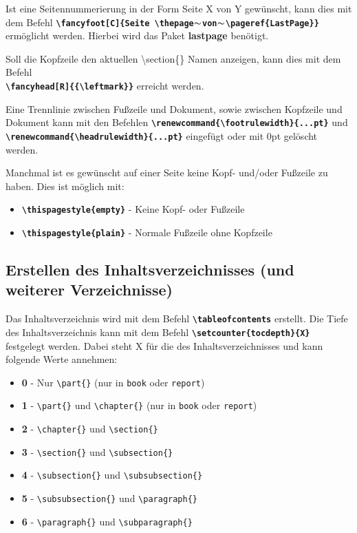Ist eine Seitennummerierung in der Form Seite X von Y gewünscht, kann dies mit dem Befehl \textbf{\texttt{\textbackslash fancyfoot[C]\{Seite \textbackslash thepage$\thicksim$von$\thicksim$\textbackslash pageref\{LastPage\}\}}} ermöglicht werden. Hierbei wird das Paket \textbf{lastpage} benötigt.

Soll die Kopfzeile den aktuellen \textbackslash section\{\} Namen anzeigen, kann dies mit dem Befehl \\ \textbf{\texttt{\textbackslash fancyhead[R]\{\{\textbackslash leftmark\}\}}} erreicht werden.

Eine Trennlinie zwischen Fußzeile und Dokument, sowie zwischen Kopfzeile und Dokument kann mit den Befehlen \textbf{\texttt{\textbackslash renewcommand\{\textbackslash footrulewidth\}\{...pt\}}} und \textbf{\texttt{\textbackslash renewcommand\{\textbackslash headrulewidth\}\{...pt\}}} eingefügt oder mit 0pt gelöscht werden.

Manchmal ist es gewünscht auf einer Seite keine Kopf- und/oder Fußzeile zu haben. Dies ist möglich mit:
\begin{itemize}
    \item \textbf{\texttt{\textbackslash thispagestyle\{empty\}}} - Keine Kopf- oder Fußzeile
    \item \textbf{\texttt{\textbackslash thispagestyle\{plain\}}} - Normale Fußzeile ohne Kopfzeile
\end{itemize}

\subsection{Erstellen des Inhaltsverzeichnisses (und weiterer Verzeichnisse)}
\label{sec:inhaltsverzeichnis}
Das Inhaltsverzeichnis wird mit dem Befehl \textbf{\texttt{\textbackslash tableofcontents}} erstellt. Die Tiefe des Inhaltsverzeichnis kann mit dem Befehl \textbf{\texttt{\textbackslash setcounter\{tocdepth\}\{X\}}} festgelegt werden. Dabei steht X für die  des Inhaltsverzeichnisses und kann folgende Werte annehmen:

\begin{itemize}
    \item \textbf{0} - Nur \texttt{\textbackslash part\{\}} (nur in \texttt{book} oder \texttt{report})
    \item \textbf{1} - \texttt{\textbackslash part\{\}} und \texttt{\textbackslash chapter\{\}} (nur in \texttt{book} oder \texttt{report})
    \item \textbf{2} - \texttt{\textbackslash chapter\{\}} und \texttt{\textbackslash section\{\}}
    \item \textbf{3} - \texttt{\textbackslash section\{\}} und \texttt{\textbackslash subsection\{\}}
    \item \textbf{4} - \texttt{\textbackslash subsection\{\}} und \texttt{\textbackslash subsubsection\{\}}
    \item \textbf{5} - \texttt{\textbackslash subsubsection\{\}} und \texttt{\textbackslash paragraph\{\}}
    \item \textbf{6} - \texttt{\textbackslash paragraph\{\}} und \texttt{\textbackslash subparagraph\{\}}
\end{itemize}

